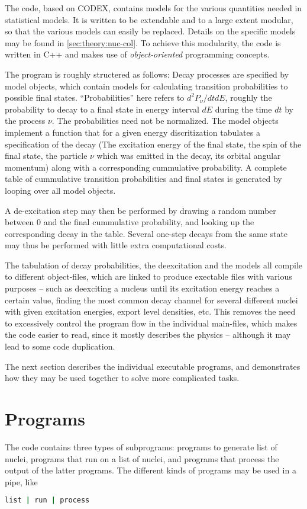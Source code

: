The \codename{} code, based on CODEX\cite{gollerthan:1988:thesis}, contains models for the various quantities needed in statistical models. It is written to be extendable and to a large extent modular, so that the various models can easily be replaced. Details on the specific models may be found in \autoref{sec:theory:nuc-col}.
To achieve this modularity, the code is written in C++ and makes use of \emph{object-oriented} programming concepts. 

The program is roughly structered as follows:
 Decay processes are specified by model objects, which contain models for calculating transition probabilities to possible final states. ``Probabilities'' here refers to $d^2 P_\nu/dtdE$, roughly the probability to decay to a final state in energy interval $dE$ during the time $dt$ by the process $\nu$. The probabilities need not be normalized.
The model objects implement a function that for a given energy discritization tabulates a specification of the decay (The excitation energy of the final state, the spin of the final state, the particle $\nu$ which was emitted in the decay, its orbital angular momentum) along with a corresponding cummulative probability. A complete table of cummulative transition probabilities and final states is generated by looping over all model objects.

 A de-excitation step may then be performed by drawing a random number between $0$ and the final cummulative probability, and looking up the corresponding decay in the table. Several one-step decays from the same state may thus be performed with little extra computational costs.

The tabulation of decay probabilities, the deexcitation and the models all compile to different object-files, which are linked to produce exectable files with various purposes -- such as deexciting a nucleus until its excitation energy reaches a certain value, finding the most common decay channel for several different nuclei with given excitation energies, export level densities, etc. 
This removes the need to excessively control the program flow in the individual main-files, which makes the code easier to read, since it mostly describes the physics -- although it may lead to some code duplication.

The next section describes the individual executable programs, and demonstrates how they may be used together to solve more complicated tasks.

\section{Programs}
The \codename{} code contains three types of subprograms: programs to generate list of nuclei, programs that run on a list of nuclei, and programs that process the output of the latter programs.
The different kinds of programs may be used in a pipe, like
\begin{lstlisting}[language=bash]
list | run | process
\end{lstlisting}

